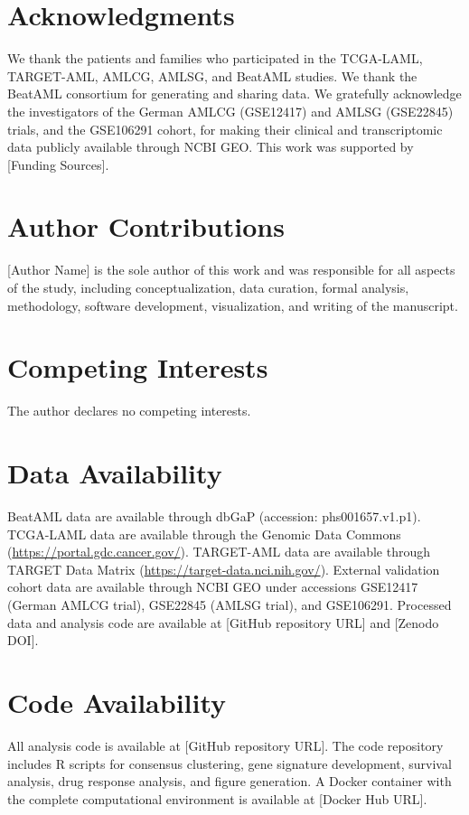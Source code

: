 \documentclass[11pt,a4paper]{article}
\begin{document}
\section*{Acknowledgments}

We thank the patients and families who participated in the TCGA-LAML, TARGET-AML, AMLCG, AMLSG, and BeatAML studies. We thank the BeatAML consortium for generating and sharing data. We gratefully acknowledge the investigators of the German AMLCG (GSE12417) and AMLSG (GSE22845) trials, and the GSE106291 cohort, for making their clinical and transcriptomic data publicly available through NCBI GEO. This work was supported by [Funding Sources].

\section*{Author Contributions}

[Author Name] is the sole author of this work and was responsible for all aspects of the study, including conceptualization, data curation, formal analysis, methodology, software development, visualization, and writing of the manuscript.

\section*{Competing Interests}

The author declares no competing interests.

\section*{Data Availability}

BeatAML data are available through dbGaP (accession: phs001657\allowbreak.v1\allowbreak.p1). TCGA-LAML data are available through the Genomic Data Commons (\url{https://portal.gdc.cancer.gov/}). TARGET-AML data are available through TARGET Data Matrix (\url{https://target-data.nci.nih.gov/}). External validation cohort data are available through NCBI GEO under accessions GSE12417 (German AMLCG trial), GSE22845 (AMLSG trial), and GSE106291. Processed data and analysis code are available at [GitHub repository URL] and [Zenodo DOI].

\section*{Code Availability}

All analysis code is available at [GitHub repository URL]. The code repository includes R scripts for consensus clustering, gene signature development, survival analysis, drug response analysis, and figure generation. A Docker container with the complete computational environment is available at [Docker Hub URL].

\begingroup
\small
\setlength{\bibsep}{1.5pt}


\endgroup
\end{document}
